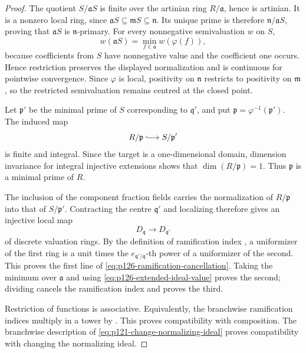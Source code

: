 \begin{proof}
The quotient \(S/\mathfrak aS\) is finite over the artinian ring
\(R/\mathfrak a\), hence is artinian.  It is a nonzero local ring, since
\(\mathfrak aS\subseteq\mathfrak mS\subseteq\mathfrak n\).  Its unique
prime is therefore \(\mathfrak n/\mathfrak aS\), proving that
\(\mathfrak aS\) is \(\mathfrak n\)-primary.  For every nonnegative
semivaluation \(w\) on \(S\),
\[
 w(\mathfrak aS)=\min_{f\in\mathfrak a}w(\varphi(f)),
 \tag{\(\clubsuit\)}\label{eq:p126-extended-ideal-value}
\]
because coefficients from \(S\) have nonnegative value and the coefficient
one occurs.  Hence restriction preserves the displayed normalization and
is continuous for pointwise convergence.  Since \(\varphi\) is local,
positivity on \(\mathfrak n\) restricts to positivity on \(\mathfrak m\), so
the restricted semivaluation remains centred at the closed point.

Let \(\mathfrak p'\) be the minimal prime of \(S\) corresponding to
\(\mathfrak q'\), and put
\(\mathfrak p=\varphi^{-1}(\mathfrak p')\).  The induced map
\[
             R/\mathfrak p\lhook\joinrel\longrightarrow
             S/\mathfrak p'
\]
is finite and integral.  Since the target is a one-dimensional domain,
dimension invariance for integral injective extensions
\cite[Tag~00OK]{StacksProject} shows that
\(\dim(R/\mathfrak p)=1\).  Thus \(\mathfrak p\) is a minimal prime of
\(R\).

The inclusion of the component fraction fields carries the normalization
of \(R/\mathfrak p\) into that of \(S/\mathfrak p'\).  Contracting the
centre \(\mathfrak q'\) and localizing therefore gives an injective local
map
\[
                       D_{\mathfrak q}\longrightarrow D_{\mathfrak q'}
\]
of discrete valuation rings.  By the definition of ramification index
\cite[Tag~09E4]{StacksProject}, a uniformizer of the first ring is a unit
times the \(e_{\mathfrak q'/\mathfrak q}\)-th power of a uniformizer of
the second.  This proves the first line of
\eqref{eq:p126-ramification-cancellation}.  Taking the minimum over
\(\mathfrak a\) and using \eqref{eq:p126-extended-ideal-value} proves the
second; dividing cancels the ramification index and proves the third.

Restriction of functions is associative.  Equivalently, the branchwise
ramification indices multiply in a tower by
\cite[Tag~0BRL]{StacksProject}.  This proves compatibility with composition.
The branchwise description of
\eqref{eq:p121-change-normalizing-ideal} proves compatibility with changing
the normalizing ideal.
\end{proof}
